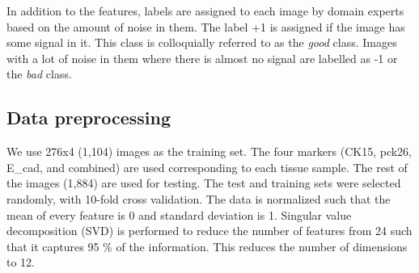 In addition to the features, labels are assigned to each image by domain experts based on the amount of noise in them. The label +1 is assigned if the image has some signal in it. This class is colloquially referred to as the \textit{good} class.  Images with a lot of noise in them where there is almost no signal are labelled as -1 or the \textit{bad} class.


\subsection{Data preprocessing}
We use 276x4 (1,104) images as the training set. The four markers (CK15, pck26, E\_cad, and combined) are used corresponding to each tissue sample. The rest of the images (1,884) are used for testing. The test and training sets were selected randomly, with 10-fold cross validation. The data is normalized such that the mean of every feature is 0 and standard deviation is 1.
Singular value decomposition (SVD) is performed to reduce the number of features from 24 such that it captures 95 \% of the information. This reduces the number of dimensions to 12.


